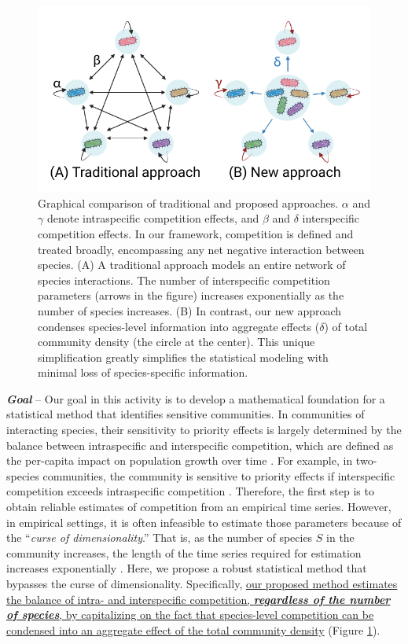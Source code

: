 \documentclass[12pt, class=article, crop=false]{standalone}
\begin{document}
\begin{figure}
    \includegraphics[scale = 0.7]{output/figure_model.pdf}
    \caption{
    Graphical comparison of traditional and proposed approaches.
    $\alpha$ and $\gamma$ denote intraspecific competition effects, and $\beta$ and $\delta$ interspecific competition effects.
    In our framework, competition is defined and treated broadly, encompassing any net negative interaction between species.
    (A) A traditional approach models an entire network of species interactions.
    The number of interspecific competition parameters (arrows in the figure) increases exponentially as the number of species increases.
    (B) In contrast, our new approach condenses species-level information into aggregate effects ($\delta$) of total community density (the circle at the center).
    This unique simplification greatly simplifies the statistical modeling with minimal loss of species-specific information.
    }
    \label{fig:model_concept}
\end{figure}

\textbf{\textit{Goal}} -- 
Our goal in this activity is to develop a mathematical foundation for a statistical method that identifies sensitive communities.
In communities of interacting species, their sensitivity to priority effects is largely determined by the balance between intraspecific and interspecific competition, which are defined as the per-capita impact on population growth over time \citep{chesson_mechanisms_2000, barabas_chessons_2018, ke_coexistence_2018, terui_intentional_2023}.
For example, in two-species communities, the community is sensitive to priority effects if interspecific competition exceeds intraspecific competition \citep{ke_coexistence_2018}.
Therefore, the first step is to obtain reliable estimates of competition from an empirical time series.
However, in empirical settings, it is often infeasible to estimate those parameters because of the ``\textit{curse of dimensionality}.'' That is, as the number of species $S$ in the community increases, the length of the time series required for estimation increases exponentially \citep{ovaskainen_how_2017}.
Here, we propose a robust statistical method that bypasses the curse of dimensionality. Specifically, \ul{our proposed method estimates the balance of intra- and interspecific competition, \textbf{\textit{regardless of the number of species}}, by capitalizing on the fact that species-level competition can be condensed into an aggregate effect of the total community density} (Figure \ref{fig:model_concept}).
\end{document}
